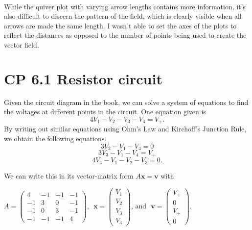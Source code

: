 \documentclass[11pt]{article}
\begin{document}
    \begin{center}
    \end{center}
    { \hspace*{\fill} \\}
    
    While the quiver plot with varying arrow lengths contains more
information, it's also difficult to discern the pattern of the field,
which is clearly visible when all arrows are made the same length. I
wasn't able to set the axes of the plots to reflect the distances as
opposed to the number of points being used to create the vector field.

    \section{CP 6.1 Resistor circuit}\label{cp-6.1-resistor-circuit}

Given the circuit diagram in the book, we can solve a system of
equations to find the voltages at different points in the circuit. One
equation given is \[4V_1 - V_2 - V_3 - V_4 = V_+.\] By writing out
similar equations using Ohm's Law and Kirchoff's Junction Rule, we
obtain the following equations. \[3V_2 - V_1 - V_4 = 0\]
\[3V_3 - V_1 - V_4 = V_+\] \[4V_4 - V_1 - V_2 - V_3 = 0.\]

    We can write this in its vector-matrix form \(A\mathbf{x} = \mathbf{v}\)
with

\(A = \begin{pmatrix}  4 & -1 & -1 & -1 \\  -1 & 3 & 0 & -1 \\  -1 & 0 & 3 & -1 \\  -1 & -1 & -1 & 4 \end{pmatrix} \text{, }\)
\(\mathbf{x} = \begin{pmatrix} V_1 \\ V_2 \\ V_3 \\ V_4 \end{pmatrix} \text{, and }\)
\(\mathbf{v} = \begin{pmatrix} V_+ \\ 0 \\ V_+ \\ 0 \end{pmatrix}.\)
\end{document}
